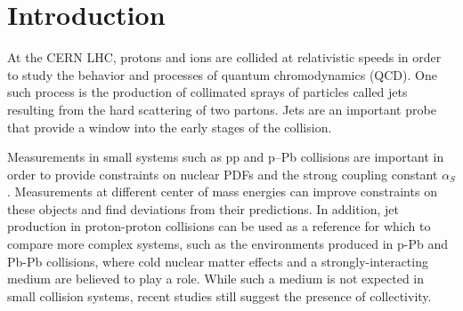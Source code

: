\section{Introduction}
\label{chap:Introduction}

At the CERN LHC, protons and ions are collided at relativistic speeds in order to study the behavior and processes of quantum chromodynamics (QCD). One such process is the production of collimated sprays of particles called jets resulting from the hard scattering of two partons. Jets are an important probe that provide a window into the early stages of the collision.

Measurements in small systems such as pp and p--Pb collisions are important in order to provide constraints on nuclear PDFs and the strong coupling constant $\alpha_{S}$ \cite{CMSPDFConstraints}. Measurements at different center of mass energies can improve constraints on these objects and find deviations from their predictions. In addition, jet production in proton-proton collisions can be used as a reference for which to compare more complex systems, such as the environments produced in p-Pb and Pb-Pb collisions, where cold nuclear matter effects and a strongly-interacting medium are believed to play a role. While such a medium is not expected in small collision systems, recent studies still suggest the presence of collectivity.